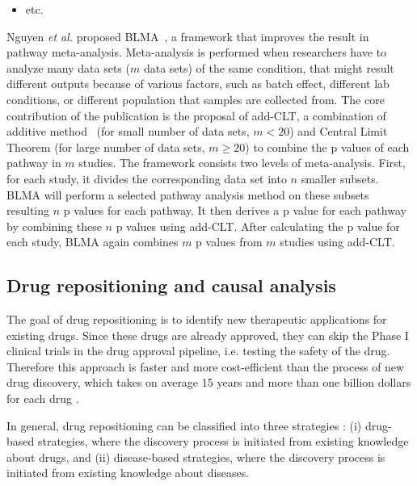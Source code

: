\begin{itemize}
\item etc.


\end{itemize}

Nguyen \textit{et al.} proposed BLMA~\cite{nguyen2017blma,nguyen2015novel}, a framework that improves the result in pathway meta-analysis. Meta-analysis is performed when researchers have to analyze many data sets ($m$ data sets) of the same condition, that might result different outputs because of various factors, such as batch effect, different lab conditions, or different population that samples are collected from.
The core contribution of the publication is the proposal of add-CLT, a combination of additive method~\cite{edgington1972additive} (for small number of data sets, $m < 20$) and Central Limit Theorem (for large number of data sets, $m \geq 20$) to combine the p values of each pathway in $m$ studies.
The framework consists two levels of meta-analysis. First, for each study, it divides the corresponding data set into $n$ smaller subsets. BLMA will perform a selected pathway analysis method on these subsets resulting $n$ p values for each pathway. It then derives a p value for each pathway by combining these $n$ p values using add-CLT. After calculating the p value for each study, BLMA again combines $m$ p values from $m$ studies using add-CLT.




\subsection{Drug repositioning and causal analysis}

The goal of drug repositioning is to identify new therapeutic applications for existing drugs. Since these drugs are already approved, they can skip the Phase I clinical trials in the drug approval pipeline, i.e. testing the safety of the drug. Therefore this approach is faster and more cost-efficient than the process of new drug discovery, which takes on average 15 years and more than one billion dollars for each drug \cite{chong2007new}. 

In general, drug repositioning can be classified into three strategies \cite{jarada2020review}: (i) drug-based strategies, where the discovery process is initiated from existing knowledge about drugs, and (ii) disease-based strategies, where the discovery process is initiated from existing knowledge about diseases. %


